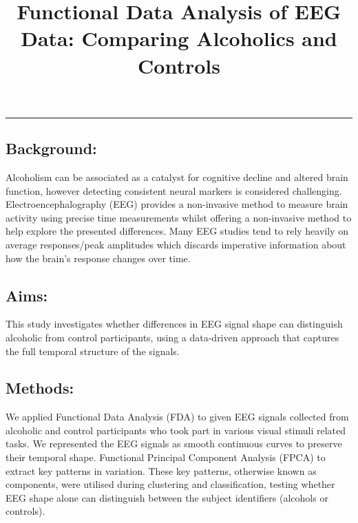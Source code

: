 \documentclass{article}
\title{Functional Data Analysis of EEG Data: Comparing Alcoholics and
Controls}
\author{
  }
\begin{document}
\maketitle


\begin{abstract}

\end{abstract}


\begin{center}\rule{0.5\linewidth}{0.5pt}\end{center}

\subsection{Background:}\label{background}

Alcoholism can be associated as a catalyst for cognitive decline and
altered brain function, however detecting consistent neural markers is
considered challenging. Electroencephalography (EEG) provides a
non-invasive method to measure brain activity using precise time
measurements whilst offering a non-invasive method to help explore the
presented differences. Many EEG studies tend to rely heavily on average
responses/peak amplitudes which discards imperative information about
how the brain's response changes over time.

\subsection{Aims:}\label{aims}

This study investigates whether differences in EEG signal shape can
distinguish alcoholic from control participants, using a data-driven
approach that captures the full temporal structure of the signals.

\subsection{Methods:}\label{methods}

We applied Functional Data Analysis (FDA) to given EEG signals collected
from alcoholic and control participants who took part in various visual
stimuli related tasks. We represented the EEG signals as smooth
continuous curves to preserve their temporal shape. Functional Principal
Component Analysis (FPCA) to extract key patterns in variation. These
key patterns, otherwise known as components, were utilised during
clustering and classification, testing whether EEG shape alone can
distinguish between the subject identifiers (alcohols or controls).
\end{document}

